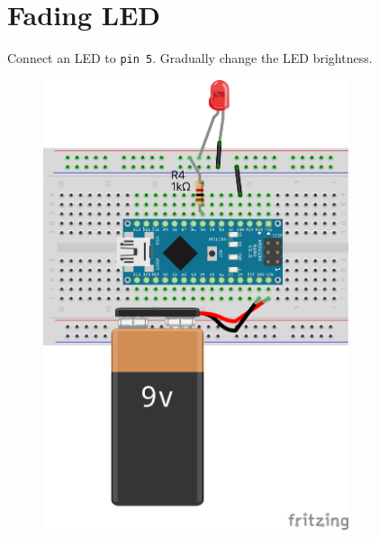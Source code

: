 \documentclass{article}
\begin{document}
\section*{Fading LED}
\begin{minipage}{\textwidth}
Connect an LED to \texttt{pin 5}. Gradually change the LED brightness.
\end{minipage}
\begin{figure}[h!]
\centering
\includegraphics[width=0.8\textwidth]{fade_nano_bb.png}
\end{figure}
\newpage
\end{document}
